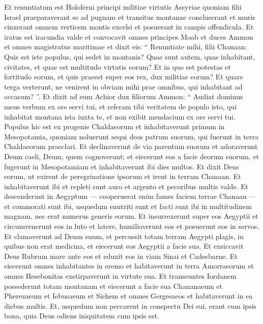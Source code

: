 \begin{biblechapter}
\begin{biblechapter}
\begin{biblechapter}
\begin{biblechapter}
\begin{biblechapter}
\verse Et renuntiatum est Holoferni principi militiae virtutis Assyriae quoniam filii Israel praeparaverant se ad pugnam et transitus montanae concluserant et muris cinxerant omnem verticem montis excelsi et posuerant in campis offendicula. 
\verse Et iratus est iracundia valde et convocavit omnes principes Moab et duces Ammon et omnes magistratus maritimae 
\verse et dixit eis: “ Renuntiate mihi, filii Chanaan: Quis est iste populus, qui sedet in montanis? Quae sunt autem, quas inhabitant, civitates, et quae est multitudo virtutis eorum? Et in quo est potestas et fortitudo eorum, et quis praeest super eos rex, dux militiae eorum? 
\verse Et quare terga verterunt, ne venirent in obviam mihi prae omnibus, qui inhabitant ad occasum? ”. 
\verse Et dixit ad eum Achior dux filiorum Ammon: “ Audiat dominus meus verbum ex ore servi tui, et referam tibi veritatem de populo isto, qui inhabitat montana ista iuxta te, et non exibit mendacium ex ore servi tui. 
\verse Populus hic est ex progenie Chaldaeorum 
\verse et inhabitaverunt primum in Mesopotamia, quoniam noluerunt sequi deos patrum suorum, qui fuerunt in terra Chaldaeorum praeclari. 
\verse Et declinaverunt de via parentum suorum et adoraverunt Deum caeli, Deum, quem cognoverunt; et eiecerunt eos a facie deorum suorum, et fugerunt in Mesopotamiam et inhabitaverunt ibi dies multos. 
\verse Et dixit Deus eorum, ut exirent de peregrinatione ipsorum et irent in terram Chanaan. Et inhabitaverunt ibi et repleti sunt auro et argento et pecoribus multis valde. 
\verse Et descenderunt in Aegyptum — cooperuerat enim fames faciem terrae Chanaan — et commorati sunt ibi, usquedum enutriti sunt et facti sunt ibi in multitudinem magnam, nec erat numerus generis eorum. 
\verse Et insurrexerunt super eos Aegyptii et circumvenerunt eos in luto et latere, humiliaverunt eos et posuerunt eos in servos. 
\verse Et clamaverunt ad Deum suum, et percussit totam terram Aegypti plagis, in quibus non erat medicina, et eiecerunt eos Aegyptii a facie sua. 
 \verse Et exsiccavit Deus Rubrum mare ante eos 
\verse et eduxit eos in viam Sinai et Cadesbarne. Et eiecerunt omnes inhabitantes in eremo 
\verse et habitaverunt in terra Amorraeorum et omnes Hesebonitas exstirpaverunt in virtute sua. Et transeuntes Iordanem possederunt totam montanam 
\verse et eiecerunt a facie sua Chananaeum et Pherezaeum et Iebusaeum et Sichem et omnes Gergesaeos et habitaverunt in ea diebus multis. 
\verse Et, usquedum non peccarent in conspectu Dei sui, erant cum ipsis bona, quia Deus odiens iniquitatem cum ipsis est. 

\end{biblechapter}
\end{biblechapter}
\end{biblechapter}
\end{biblechapter}
\end{biblechapter}
